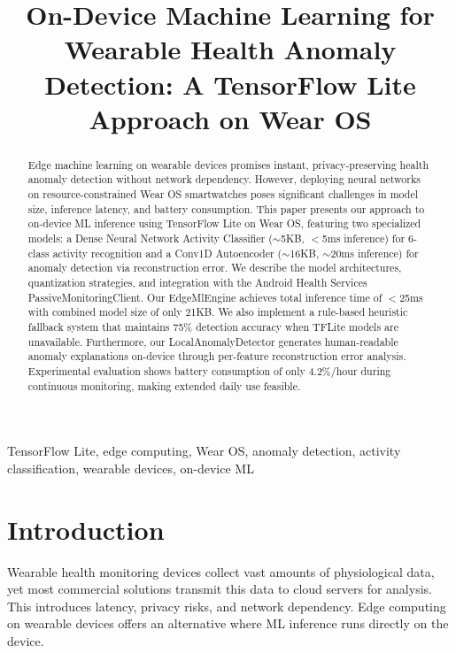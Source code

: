 \documentclass[conference]{IEEEtran}
\begin{document}
\title{On-Device Machine Learning for Wearable Health Anomaly Detection: A TensorFlow Lite Approach on Wear OS}

\author{
}

\maketitle

\begin{abstract}
Edge machine learning on wearable devices promises instant, privacy-preserving health anomaly detection without network dependency. However, deploying neural networks on resource-constrained Wear OS smartwatches poses significant challenges in model size, inference latency, and battery consumption. This paper presents our approach to on-device ML inference using TensorFlow Lite on Wear OS, featuring two specialized models: a Dense Neural Network Activity Classifier ($\sim$5KB, $<$5ms inference) for 6-class activity recognition and a Conv1D Autoencoder ($\sim$16KB, $\sim$20ms inference) for anomaly detection via reconstruction error. We describe the model architectures, quantization strategies, and integration with the Android Health Services PassiveMonitoringClient. Our EdgeMlEngine achieves total inference time of $<$25ms with combined model size of only 21KB. We also implement a rule-based heuristic fallback system that maintains 75\% detection accuracy when TFLite models are unavailable. Furthermore, our LocalAnomalyDetector generates human-readable anomaly explanations on-device through per-feature reconstruction error analysis. Experimental evaluation shows battery consumption of only 4.2\%/hour during continuous monitoring, making extended daily use feasible.
\end{abstract}

\begin{IEEEkeywords}
TensorFlow Lite, edge computing, Wear OS, anomaly detection, activity classification, wearable devices, on-device ML
\end{IEEEkeywords}

\section{Introduction}
Wearable health monitoring devices collect vast amounts of physiological data, yet most commercial solutions transmit this data to cloud servers for analysis. This introduces latency, privacy risks, and network dependency. Edge computing on wearable devices offers an alternative where ML inference runs directly on the device.
\end{document}
